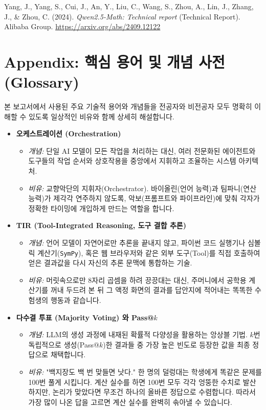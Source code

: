 Yang, J., Yang, S., Cui, J., An, Y., Liu, C., Wang, S., Zhou, A., Lin, J., Zhang, J., \& Zhou, C. (2024). \textit{Qwen2.5-Math: Technical report} (Technical Report). Alibaba Group. \url{https://arxiv.org/abs/2409.12122} \par

\endgroup

\newpage
\section{Appendix: 핵심 용어 및 개념 사전 (Glossary)}

본 보고서에서 사용된 주요 기술적 용어와 개념들을 전공자와 비전공자 모두 명확히 이해할 수 있도록 일상적인 비유와 함께 상세히 해설합니다.

\begin{itemize}
    \item \textbf{오케스트레이션 (Orchestration)}
    \begin{itemize}
        \item \textit{개념:} 단일 AI 모델이 모든 작업을 처리하는 대신, 여러 전문화된 에이전트와 도구들의 작업 순서와 상호작용을 중앙에서 지휘하고 조율하는 시스템 아키텍처.
        \item \textit{비유:} 교향악단의 지휘자(Orchestrator). 바이올린(언어 능력)과 팀파니(연산 능력)가 제각각 연주하지 않도록, 악보(프롬프트와 파이프라인)에 맞춰 각자가 정확한 타이밍에 개입하게 만드는 역할을 합니다.
    \end{itemize}
    
    \item \textbf{TIR (Tool-Integrated Reasoning, 도구 결합 추론)}
    \begin{itemize}
        \item \textit{개념:} 언어 모델이 자연어로만 추론을 끝내지 않고, 파이썬 코드 실행기나 심볼릭 계산기(\texttt{SymPy}), 혹은 웹 브라우저와 같은 외부 도구(Tool)를 직접 호출하여 얻은 결과값을 다시 자신의 추론 문맥에 통합하는 기술.
        \item \textit{비유:} 머릿속으로만 8자리 곱셈을 하려 끙끙대는 대신, 주머니에서 공학용 계산기를 꺼내 두드려 본 뒤 그 액정 화면의 결과를 답안지에 적어내는 똑똑한 수험생의 행동과 같습니다.
    \end{itemize}
    
    \item \textbf{다수결 투표 (Majority Voting) 와 Pass@$k$}
    \begin{itemize}
        \item \textit{개념:} LLM의 생성 과정에 내재된 확률적 다양성을 활용하는 앙상블 기법. $k$번 독립적으로 생성(Pass@$k$)한 결과들 중 가장 높은 빈도로 등장한 값을 최종 정답으로 채택합니다.
        \item \textit{비유:} "백지장도 백 번 맞들면 낫다." 한 명의 덜렁대는 학생에게 똑같은 문제를 100번 풀게 시킵니다. 계산 실수를 하면 100번 모두 각각 엉뚱한 수치로 발산하지만, 논리가 맞았다면 무조건 하나의 올바른 정답으로 수렴합니다. 따라서 가장 많이 나온 답을 고르면 계산 실수를 완벽히 솎아낼 수 있습니다.
    \end{itemize}


\end{itemize}
